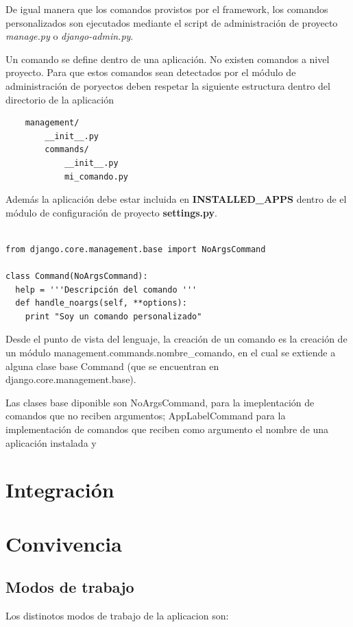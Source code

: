 \documentclass[a4paper]{report}
\begin{document}
De igual manera que los comandos provistos por el framework, los comandos
personalizados son ejecutados mediante el script de administración
de proyecto \emph{manage.py} o \emph{django-admin.py}.

Un comando se define dentro de una aplicación. No existen comandos a nivel
proyecto. Para que estos comandos sean detectados por el módulo de
administración de poryectos deben  respetar la siguiente estructura dentro del
directorio de la aplicación 
\begin{verbatim}
	management/
	    __init__.py
	    commands/
	        __init__.py
	        mi_comando.py
\end{verbatim}


Además la aplicación debe estar incluida en \textbf{INSTALLED\_APPS}
dentro de el módulo de configuración de proyecto \textbf{settings.py}.

\begin{lstlisting}[style=python,label=basic-django-command,caption=Comando
personalizado básico en Django]

from django.core.management.base import NoArgsCommand

class Command(NoArgsCommand):
  help = '''Descripción del comando '''
  def handle_noargs(self, **options):
    print "Soy un comando personalizado"

\end{lstlisting}

Desde el punto de vista del lenguaje, la creación de un comando es la creación
de un módulo management.commands.nombre\_comando, en el cual se extiende 
a alguna clase base Command (que se encuentran en django.core.management.base).

Las clases base diponible son NoArgsCommand, para la imeplentación de comandos
que no reciben argumentos; AppLabelCommand para la implementación de comandos
que reciben como argumento el nombre de una aplicación instalada y 

\section{Integración}
\section{Convivencia}

\subsection{Modos de trabajo}
Los distinotos modos de trabajo de la aplicacion son:
\end{document}
